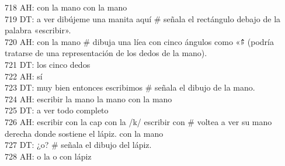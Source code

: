 718 AH: con la mano con la mano\\
719 DT: a ver dibújeme una manita aquí \# señala el rectángulo debajo de la palabra «escribir».\\
720 AH: con la mano \# dibuja una líea con cinco ángulos como «\^\^\^\^\^» (podría tratarse de una representación de los dedos de la mano).\\
721 DT: los cinco dedos\\
722 AH: sí\\
723 DT: muy bien entonces escribimos \# señala el dibujo de la mano.\\
724 AH: escribir la mano la mano con la mano\\
725 DT: a ver todo completo\\
726 AH: escribir con la cap con la /k/ escribir con \# voltea a ver su mano derecha donde sostiene el lápiz. con la mano\\
727 DT: ¿o? \# señala el dibujo del lápiz.\\
728 AH: o la o con lápiz\\
